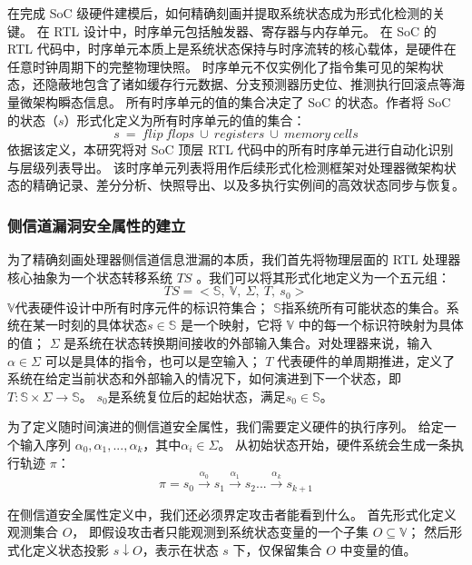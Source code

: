 在完成 SoC 级硬件建模后，如何精确刻画并提取系统状态成为形式化检测的关键。
在 RTL 设计中，时序单元包括触发器、寄存器与内存单元。
在 SoC 的 RTL 代码中，时序单元本质上是系统状态保持与时序流转的核心载体，是硬件在任意时钟周期下的完整物理快照。
时序单元不仅实例化了指令集可见的架构状态，还隐蔽地包含了诸如缓存行元数据、分支预测器历史位、推测执行回滚点等海量微架构瞬态信息。
所有时序单元的值的集合决定了 SoC 的状态。作者将 SoC 的状态（$s$）形式化定义为所有时序单元的值的集合：
$$s\ =\ flip\ flops\ \cup\ registers\ \cup\ memory\ cells$$
依据该定义，本研究将对 SoC 顶层 RTL 代码中的所有时序单元进行自动化识别与层级列表导出。
该时序单元列表将用作后续形式化检测框架对处理器微架构状态的精确记录、差分分析、快照导出、以及多执行实例间的高效状态同步与恢复。

\subsubsection{侧信道漏洞安全属性的建立}


为了精确刻画处理器侧信道信息泄漏的本质，我们首先将物理层面的 RTL 处理器核心抽象为一个状态转移系统 $TS$ \cite{10.1145/3669940.3707263}。我们可以将其形式化地定义为一个五元组：
$$TS=<\mathbb{S},\ \mathbb{V},\ \Sigma,\ T,\ s_0>$$
$\mathbb{V}$代表硬件设计中所有时序元件的标识符集合；
$\mathbb{S}$指系统所有可能状态的集合。系统在某一时刻的具体状态$s \in \mathbb{S}$ 是一个映射，它将 $\mathbb{V}$ 中的每一个标识符映射为具体的值；
$\Sigma$ 是系统在状态转换期间接收的外部输入集合。对处理器来说，输入 $\alpha \in \Sigma$ 可以是具体的指令，也可以是空输入；
$T$ 代表硬件的单周期推进，定义了系统在给定当前状态和外部输入的情况下，如何演进到下一个状态，即 $T:\mathbb{S}\times\Sigma\rightarrow\mathbb{S}$。
$s_0$是系统复位后的起始状态，满足$s_0 \in \mathbb{S}$。

为了定义随时间演进的侧信道安全属性，我们需要定义硬件的执行序列。
给定一个输入序列 $\alpha_0, \alpha_1, ..., \alpha_k$，其中$\alpha_i\in\Sigma$。
从初始状态开始，硬件系统会生成一条执行轨迹 $\pi$：
$$\pi=s_0\xrightarrow{\alpha_0}s_1\xrightarrow{\alpha_1}s_2...\xrightarrow{\alpha_k}s_{k+1}$$

在侧信道安全属性定义中，我们还必须界定攻击者能看到什么。
首先形式化定义观测集合 $O$， 即假设攻击者只能观测到系统状态变量的一个子集 $O\subseteq\mathbb{V}$；
然后形式化定义状态投影 $s \downarrow O$，表示在状态 $s$ 下，仅保留集合 $O$ 中变量的值。

